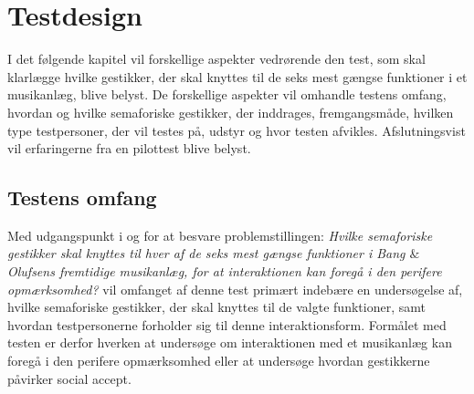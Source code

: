 \chapter{Testdesign}
\label{TestdesignValgAfGestikker}
%
I det følgende kapitel vil forskellige aspekter vedrørende den test, som skal klarlægge hvilke gestikker, der skal knyttes til de seks mest gængse funktioner i et musikanlæg, blive belyst. De forskellige aspekter vil omhandle testens omfang, hvordan og hvilke semaforiske gestikker, der inddrages, fremgangsmåde, hvilken type testpersoner, der vil testes på, udstyr og hvor testen afvikles. Afslutningsvist vil erfaringerne fra en pilottest blive belyst.   
%
\section{Testens omfang}
\label{TestensOmfangValgAfGestikker}
%
Med udgangspunkt i og for at besvare problemstillingen: \textit{Hvilke  semaforiske gestikker skal knyttes til hver af de seks mest gængse funktioner i Bang $\&$ Olufsens fremtidige musikanlæg, for at interaktionen kan foregå i den perifere opmærksomhed?} vil omfanget af denne test primært indebære en undersøgelse af, hvilke semaforiske gestikker, der skal knyttes til de valgte funktioner, samt hvordan testpersonerne forholder sig til denne interaktionsform. Formålet med testen er derfor hverken at undersøge om interaktionen med et musikanlæg kan foregå i den perifere opmærksomhed eller at undersøge hvordan gestikkerne påvirker social accept. 


